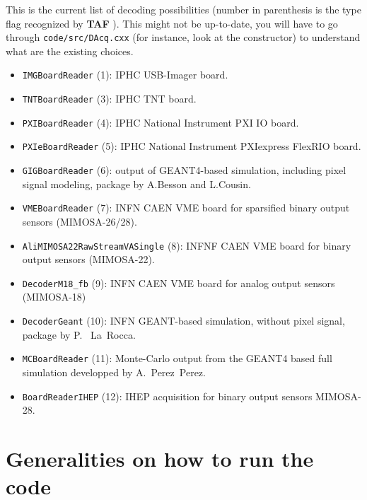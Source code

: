 \documentclass[a4paper, 12pt, twoside]{article}
\newif\ifwithcomment
\newcommand{\comment}[1]{\ifwithcomment {\textcolor{blue}{\it#1}} \fi}
\newcommand{\TAF}{{\bf TAF }}
\begin{document}
This is the current list of decoding possibilities (number in parenthesis is the type flag recognized by \TAF). This might not be up-to-date, you will have to go through {\tt code/src/DAcq.cxx} (for instance, look at the constructor) to understand what are the existing choices.

\begin{itemize}
\item {\tt IMGBoardReader} (1): IPHC USB-Imager board.
\item {\tt TNTBoardReader} (3): IPHC TNT board.
\item {\tt PXIBoardReader} (4): IPHC National Instrument PXI IO board.
\item {\tt PXIeBoardReader} (5): IPHC National Instrument PXIexpress FlexRIO board.
\item {\tt GIGBoardReader} (6): output of GEANT4-based simulation, including pixel signal modeling, package by A.Besson and L.Cousin.
\item {\tt VMEBoardReader} (7): INFN CAEN VME board for sparsified binary output sensors (MIMOSA-26/28).
\item {\tt AliMIMOSA22RawStreamVASingle} (8): INFNF CAEN VME board for binary output sensors (MIMOSA-22).
\item {\tt DecoderM18\_fb} (9): INFN CAEN VME board for analog output sensors (MIMOSA-18)
\item {\tt DecoderGeant} (10): INFN GEANT-based simulation, without pixel signal, package by P. ~La~Rocca.
\item {\tt MCBoardReader} (11): Monte-Carlo output from the GEANT4 based full simulation developped by A.~Perez~Perez.
\item {\tt BoardReaderIHEP} (12): IHEP acquisition for binary output sensors MIMOSA-28.
\end{itemize}

\comment{Better description of each type would be useful. Especially management of triggers and frames to generate event for PXIeBoardReader is really needed.}

\comment{Operations on rawdata in {\tt DPlane::Update} and {\tt DPlane::Analyze\_{basic}} are still not described. Also the possibility to simulate discrimination is not mentionned.}

\vspace{2cm}

\section{Generalities on how to run the code}
\label{secRunning}
\end{document}
